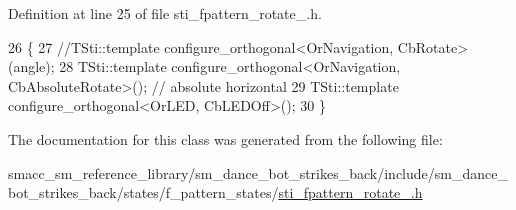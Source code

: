 Definition at line 25 of file sti\+\_\+fpattern\+\_\+rotate\+\_.\+h.


\begin{DoxyCode}
26   \{
27     \textcolor{comment}{//TSti::template configure\_orthogonal<OrNavigation, CbRotate>(angle);}
28     TSti::template configure\_orthogonal<OrNavigation, CbAbsoluteRotate>(); \textcolor{comment}{// absolute horizontal}
29     TSti::template configure\_orthogonal<OrLED, CbLEDOff>();
30   \}
\end{DoxyCode}


The documentation for this class was generated from the following file\+:\begin{DoxyCompactItemize}
\item 
smacc\+\_\+sm\+\_\+reference\+\_\+library/sm\+\_\+dance\+\_\+bot\+\_\+strikes\+\_\+back/include/sm\+\_\+dance\+\_\+bot\+\_\+strikes\+\_\+back/states/f\+\_\+pattern\+\_\+states/\hyperlink{strikes__back_2include_2sm__dance__bot__strikes__back_2states_2f__pattern__states_2sti__fpattern__rotate__2_8h}{sti\+\_\+fpattern\+\_\+rotate\+\_.\+h}\end{DoxyCompactItemize}
